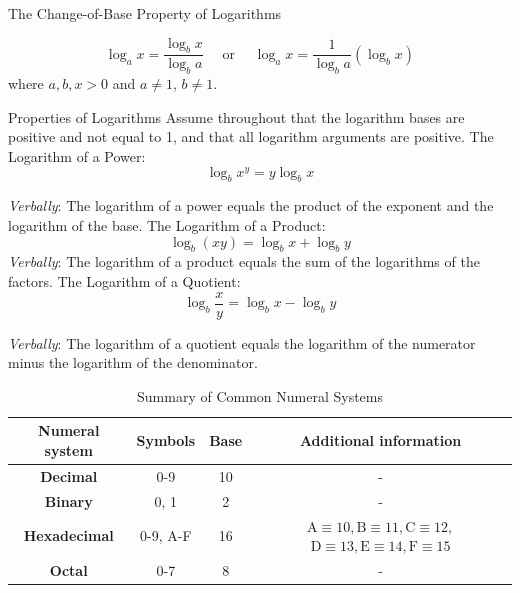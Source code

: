 \begin{custombox}{The Change-of-Base Property of Logarithms}

\begin{equation*}
\log _a x=\frac{\log_b x}{\log_b a} \quad \text { or } \quad \log_a x=\frac{1}{\log_b a}\left(\log_b x\right)
\end{equation*}
where $a,b,x>0$ and $a\neq1$, $b\neq1$.
    
\end{custombox}

\begin{custombox}{Properties of Logarithms}
\setlength{\leftskip}{1cm}  %
\setlength{\rightskip}{1cm} %
Assume throughout that the logarithm bases are positive and not equal to 1, and that all logarithm arguments are positive.
The Logarithm of a Power:
$$
\log _b x^y=y \log _b x
$$

\textit{Verbally}: The logarithm of a power equals the product of the exponent and the logarithm of the base.
\vspace{0.5cm}
The Logarithm of a Product:
$$
\log _b(x y)=\log _b x+\log _b y
$$
\textit{Verbally}: The logarithm of a product equals the sum of the logarithms of the factors.
\vspace{0.5cm}
The Logarithm of a Quotient:
$$
\log _b \frac{x}{y}=\log _b x-\log _b y
$$

\textit{Verbally}: The logarithm of a quotient equals the logarithm of the numerator minus the logarithm of the denominator.

\setlength{\leftskip}{0cm}  %
\setlength{\rightskip}{0cm} %

\end{custombox}


\begin{table}[ht]
\centering
\renewcommand{\arraystretch}{1.4}
\begin{tabular}{|c|c|c|c|}
\hline
\textbf{Numeral system} & \textbf{Symbols} & \textbf{Base} & \textbf{Additional information} \\ \hline
\textbf{Decimal} & 0-9 & 10 & - \\ \hline
\textbf{Binary} & 0, 1 & 2 & - \\ \hline
\textbf{Hexadecimal} & 0-9, A-F & 16 & $\mathrm{A} \equiv 10, \mathrm{B} \equiv 11, \mathrm{C} \equiv 12,$ $\mathrm{D} \equiv 13, \mathrm{E} \equiv 14, \mathrm{F} \equiv 15$ \\ \hline
\textbf{Octal} & 0-7 & 8 & - \\ \hline
\end{tabular}
\caption{Summary of Common Numeral Systems}
\end{table}


